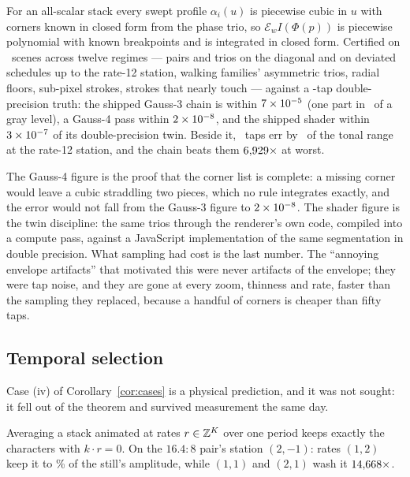 \begin{theorem}[Exactness]
\label{thm:exact}
For an all-scalar stack every swept profile $\alpha_i(u)$ is piecewise cubic in
$u$ with corners known in closed form from the phase trio, so
$\mathcal E_w I(\Phi(p))$ is piecewise polynomial with known breakpoints and is
integrated in closed form. Certified on \exactScenes\ scenes across twelve
regimes --- pairs and trios on the diagonal and on deviated schedules up to the
rate-12 station, walking families' asymmetric trios, radial floors, sub-pixel
strokes, strokes that nearly touch --- against a \exactTruthTaps-tap
double-precision truth: the shipped Gauss-3 chain is within $7\times 10^{-5}$
(one part in \exactWorstGrayFrac\ of a gray level), a Gauss-4 pass within
$2\times 10^{-8}$, and the shipped shader within $3\times 10^{-7}$ of its
double-precision twin. Beside it, \envTaps\ taps err by \exactTapsWorst\ of the
tonal range at the rate-12 station, and the chain beats them
$6{,}929\times$ at worst.
\end{theorem}

The Gauss-4 figure is the proof that the corner list is complete: a missing
corner would leave a cubic straddling two pieces, which no rule integrates
exactly, and the error would not fall from the Gauss-3 figure to
$2\times 10^{-8}$. The shader figure is the twin discipline: the same trios
through the renderer's own code, compiled into a compute pass, against a
JavaScript implementation of the same segmentation in double precision. What
sampling had cost is the last number. The ``annoying envelope artifacts'' that
motivated this were never artifacts of the envelope; they were tap noise, and
they are gone at every zoom, thinness and rate, faster than the sampling they
replaced, because a handful of corners is cheaper than fifty taps.

\subsection{Temporal selection}
\label{sec:exposure}

Case (iv) of Corollary~\ref{cor:cases} is a physical prediction, and it was
not sought: it fell out of the theorem and survived measurement the same day.

\begin{theorem}
\label{thm:exposure}
Averaging a stack animated at rates $r\in\mathbb{Z}^K$ over one period keeps exactly
the characters with $k\cdot r=0$. On the $16.4{:}8$ pair's station $(2,-1)$:
rates $(1,2)$ keep it to \exposureFaithfulPct\% of the still's amplitude, while
$(1,1)$ and $(2,1)$ wash it $14{,}668\times$.
\end{theorem}

